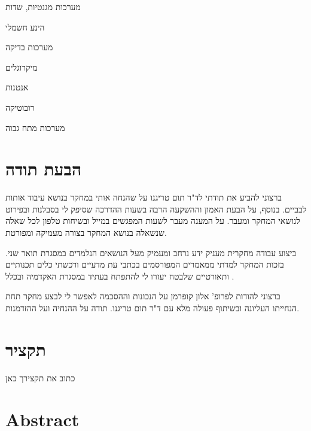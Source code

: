 \documentclass[12pt]{book}
\numberwithin{equation}{section}
\numberwithin{figure}{section}
\numberwithin{table}{section}
\begin{document}
מערכות מגנטיות, שדות 

הינע חשמלי 

מערכות בדיקה 

מיקרוגלים 

אנטנות 

רובוטיקה 

מערכות מתח גבוה 

\newpage

\section*{הבעת תודה}

ברצוני להביע את תודתי לד"ר תום טריגנו על שהנחה אותי במחקר בנושא עיבוד אותות לבביים. בנוסף, על הבעת האמון וההשקעה הרבה בשעות ההדרכה שסיפק לי בסבלנות ובפירוט לנושאי המחקר ומעבר. על המענה מעבר לשעות המפגשים במייל ובשיחות טלפון לכל שאלה שנשאלה בנושא המחקר בצורה מעמיקה ומפורטת.

ביצוע עבודה מחקרית מעניק ידע נרחב ומעמיק מעל הנושאים הנלמדים במסגרת תואר שני. בזכות המחקר
למדתי ממאמרים המפורסמים בכתבי עת מדעיים ורכשתי כלים תכנותיים ותאורטיים שלבטח יעזרו לי להתפתח בעתיד במסגרת האקדמיה ובכלל .

ברצוני להודות לפרופ' אלון קופרמן על הנכונות וההסכמה לאפשר לי לבצע מחקר תחת הנחייתו העליונה ובשיתוף פעולה מלא עם ד"ר תום טריגנו. תודה על ההנחיה ועל ההזדמנות.



\newpage

\section*{\centering תקציר}

כתוב את תקצירך כאן

\newpage

\section*{\centering Abstract}

\cleardoublepage
\tableofcontents
\cleardoublepage
\listoffigures
{}
\cleardoublepage
\listoftables
{}
\cleardoublepage
\end{document}
